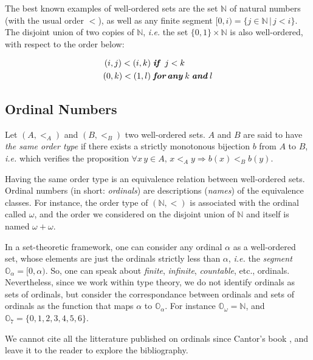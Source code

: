 The best known examples of well-ordered sets are the set $\mathbb{N}$ of natural numbers (with the usual order $<$), as well as any finite segment $[0,i)=\{j\in\mathbb{N}\,|\,j<i\}$.
The disjoint union of two copies of $\mathbb{N}$, \emph{i.e.} the set $\{0,1\}\times\mathbb{N}$ is also well-ordered,
with respect to the order below:

\begin{align*}
(i,j) < (i,k) & \;\textit{\textbf{if} }\; j < k\\
(0,k) < (1,l) & \;\textit{\textbf{for\,any}}\;k \;\textit{\textbf{and}} \; l
\end{align*}

\subsection{Ordinal Numbers}


Let $(A,<_A)$ and $(B,<_B)$ two well-ordered sets. $A$ and $B$ are said to have \emph{the same order type} if 
there exists a strictly monotonous bijection $b$ from $A$ to $B$, \emph{i.e.} which verifies the proposition
$\forall x\,y\in A,\, x <_A y \Rightarrow b(x) <_B  b(y)$.

Having the same order type is an equivalence relation between well-ordered sets. Ordinal numbers (in short: \emph{ordinals})  are descriptions (\emph{names}) of the equivalence classes.
For instance, the order type of $(\mathbb{N},<)$ is associated with the ordinal called  $\omega$, and the order we considered on 
the disjoint union of $\mathbb{N}$ and itself is named $\omega+\omega$.

In a set-theoretic framework, one can consider any ordinal $\alpha$ as a well-ordered set, whose  elements are just the ordinals strictly less than $\alpha$, \emph{i.e.} the \emph{segment} $\mathbb{O}_\alpha=[0, \alpha)$. So, one can speak about \emph{finite}, \emph{infinite}, \emph{countable}, etc., ordinals. Nevertheless, since we work within type theory, 
we do not identify ordinals as sets of ordinals, but consider the correspondance between ordinals and sets of ordinals as the function that maps $\alpha$ to $\mathbb{O}_\alpha$.
For instance $\mathbb{O}_\omega=\mathbb{N}$, and $\mathbb{O}_7=\{0,1,2,3,4,5,6\}$.


We cannot cite all the litterature published on ordinals since Cantor's book 
\cite{cantorbook}, and 
leave it to the reader to explore the bibliography. 


